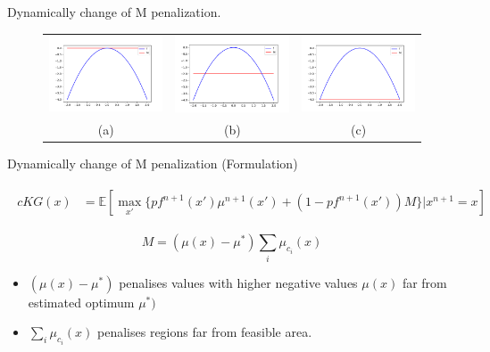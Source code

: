 \documentclass{beamer}
\begin{document}
\begin{frame}{Dynamically change of M penalization.}

\begin{figure}
	
	\centering
	\begin{tabular}{ccc}
		\includegraphics[width=0.32\linewidth]{penalty_image0.pdf}&
		\includegraphics[width=0.32\linewidth]{penalty_image-2.pdf}&
		\includegraphics[width=0.32\linewidth]{penalty_image-4.pdf}\\
		(a)&
		(b)&
		(c)\\
		
	\end{tabular}	
\end{figure}
\end{frame}

\begin{frame}{Dynamically change of M penalization (Formulation)}

\begin{align*}
\begin{split}
cKG(x) &= \mathbb{E}[\max_{x'}\{pf^{n+1}(x')\mu^{n+1}(x') + (1-pf^{n+1}(x'))M\}|x^{n+1}=x]
\end{split}
\end{align*}

$$
M = (\mu(x) - \mu^{*}) \sum_{i}{\mu_{c_{i}}(x)}
$$
\begin{itemize}
	\item $(\mu(x) - \mu^{*})$ penalises values with higher negative values $\mu(x)$ far from estimated optimum $\mu^{*})$
	\item $\sum_{i}{\mu_{c_{i}}(x)}$ penalises regions far from feasible area.
\end{itemize}
\end{frame}
\end{document}
